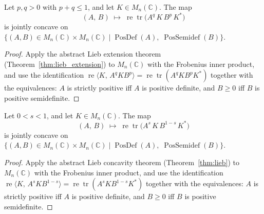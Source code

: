\begin{corollary}
  \label{cor:lieb_extension_matrix}
  \leanok
  Let $p, q > 0$ with $p + q \leq 1$, and let $K \in M_n(\mathbb{C})$.
  The map
  \[
    (A,\, B)
    \;\longmapsto\;
    \operatorname{re}\operatorname{tr}\!\bigl(A^q\, K\, B^p\, K^*\bigr)
  \]
  is jointly concave on
  $\bigl\{(A, B) \in M_n(\mathbb{C}) \times M_n(\mathbb{C}) \mid
  \operatorname{PosDef}(A),\; \operatorname{PosSemidef}(B)\bigr\}$.
  \begin{proof}
    \leanok
    Apply the abstract Lieb extension theorem (Theorem~\ref{thm:lieb_extension})
    to $M_n(\mathbb{C})$ with the Frobenius inner product, and use
    the identification $\operatorname{re}\langle K,\, A^q K B^p \rangle =
    \operatorname{re}\operatorname{tr}(A^q K B^p K^*)$ together with the equivalences:
    $A$ is strictly positive iff $A$ is positive definite,
    and $B \geq 0$ iff $B$ is positive semidefinite.
  \end{proof}
\end{corollary}

\begin{corollary}
  \label{cor:lieb_matrix}
  \leanok
  Let $0 < s < 1$, and let $K \in M_n(\mathbb{C})$.
  The map
  \[
    (A,\, B)
    \;\longmapsto\;
    \operatorname{re}\operatorname{tr}\!\bigl(A^s\, K\, B^{1-s}\, K^*\bigr)
  \]
  is jointly concave on
  $\bigl\{(A, B) \in M_n(\mathbb{C}) \times M_n(\mathbb{C}) \mid
  \operatorname{PosDef}(A),\; \operatorname{PosSemidef}(B)\bigr\}$.
  \begin{proof}
    \leanok
    Apply the abstract Lieb concavity theorem (Theorem~\ref{thm:lieb})
    to $M_n(\mathbb{C})$ with the Frobenius inner product, and use
    the identification $\operatorname{re}\langle K,\, A^s K B^{1-s} \rangle =
    \operatorname{re}\operatorname{tr}(A^s K B^{1-s} K^*)$ together with the equivalences:
    $A$ is strictly positive iff $A$ is positive definite,
    and $B \geq 0$ iff $B$ is positive semidefinite.
  \end{proof}
\end{corollary}


